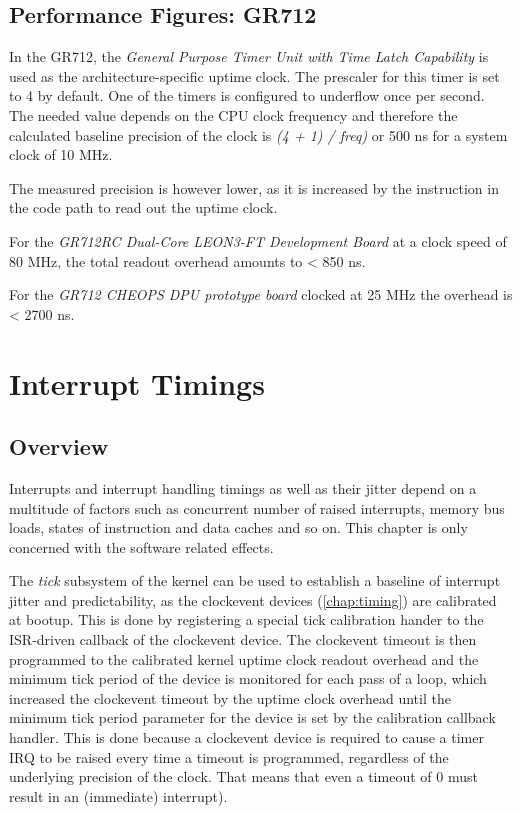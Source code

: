 \section{Performance Figures: GR712}

In the GR712, the \emph{General Purpose Timer Unit with Time Latch Capability}\cite{GR712UM}
is used as the architecture-specific uptime clock. The prescaler for this timer
is set to 4 by default. One of the timers is configured to underflow once
per second. The needed value depends on the CPU clock frequency and therefore
the calculated baseline precision of the clock is \emph{ (4 + 1) / freq)} or 500 ns 
for a system clock of 10 MHz.


The measured precision is however lower, as it is increased by the
instruction in the code path to read out the uptime clock.

For the \emph{GR712RC Dual-Core LEON3-FT Development Board} at a clock speed of
80 MHz, the total readout overhead amounts to < 850 ns.

For the \emph{GR712 CHEOPS DPU prototype board} clocked at 25 MHz
the overhead is < 2700 ns.



\chapter{Interrupt Timings}

\section{Overview}

Interrupts and interrupt handling timings as well as their jitter depend on a
multitude of factors such as concurrent number of raised interrupts, memory bus
loads, states of instruction and data caches and so on. This chapter is only
concerned with the software related effects.

The \emph{tick} subsystem of the kernel can be used to establish a baseline
of interrupt jitter and predictability, as the clockevent devices (\ref{chap:timing})
are calibrated at bootup. This is done by registering a special tick calibration
hander to the ISR-driven callback of the clockevent device. The clockevent
timeout is then programmed to the calibrated kernel uptime clock readout overhead
and the minimum tick period of the device is monitored for each pass of a loop,
which increased the clockevent timeout by the uptime clock overhead until the
minimum tick period parameter for the device is set by the calibration callback
handler. This is done because a clockevent device is required to
cause a timer IRQ to be raised every time a timeout is programmed, regardless
of the underlying precision of the clock. That means that even a timeout of 0
must result in an (immediate) interrupt).

